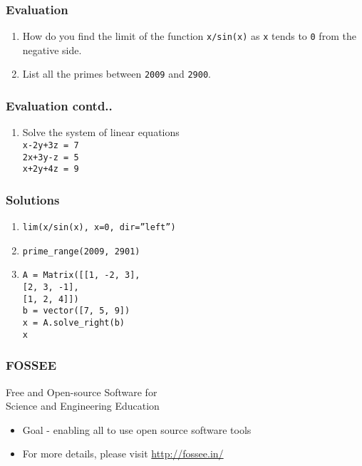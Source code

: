 \documentclass[17pt,compress]{beamer}
\newcounter{saveenumi}
\newcommand{\seti}{\setcounter{saveenumi}{\value{enumi}}}
\newcommand{\conti}{\setcounter{enumi}{\value{saveenumi}}}
\begin{document}
\begin{frame}
\frametitle{Evaluation}
\label{sec-6.1}


\begin{enumerate}
\item How do you find the limit of the function \texttt{x/sin(x)} as \texttt{x} tends 
    to \texttt{0} from the negative side.\pause
\vspace{3pt}
\item List all the primes between \texttt{2009} and \texttt{2900}.
\seti
\end{enumerate}
\end{frame}
\begin{frame}
\frametitle{Evaluation contd..}
\label{sec-6.1}


\begin{enumerate}
\conti
\item Solve the system of linear equations \\    
    \texttt{x-2y+3z = 7}\\
    \texttt{2x+3y-z = 5}\\
    \texttt{x+2y+4z = 9}
\end{enumerate}
\end{frame}
\begin{frame}
\frametitle{Solutions}
\label{sec-7}


\begin{enumerate}
\item \texttt{lim(x/sin(x), x=0, dir=''left'')}\pause
\item \texttt{prime\_range(2009, 2901)}\pause
\item \texttt{A = Matrix([[1, -2, 3],} \\
\hspace{4.2cm}  \texttt{[2, 3, -1],} \\
\hspace{4.2cm}  \texttt{[1, 2, 4]])} \\
   \texttt{b = vector([7, 5, 9])}\\
   \texttt{x = A.solve\_right(b)}\\
   \texttt{x}   
\end{enumerate}
\end{frame}
\begin{frame}
\frametitle{FOSSEE}
{\color{blue}Free and Open-source Software for \\Science and Engineering Education} \\
\begin{itemize}
\item Goal - enabling all to use open source software tools
\item For more details, please visit {\color{blue}\url{http://fossee.in/}}
\end{itemize}
\end{frame}
\end{document}
